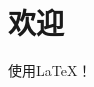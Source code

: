 \documentclass{xduugthesis}
\begin{document}
\frontmatter
\mainmatter
\chapter{欢迎}
使用\LaTeX{}！
\backmatter
\end{document}
